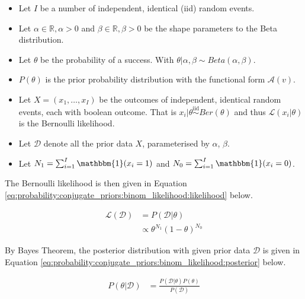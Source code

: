 \begin{itemize}
      \item Let $I$ be a number of independent, identical  (iid) random events.

      \item Let $\alpha \in \mathbb{R}, \alpha > 0$ and $\beta \in \mathbb{R}, \beta >0$ be the shape parameters to the Beta distribution.

      \item Let $\theta$ be the probability of a success. With $\theta | \alpha, \beta \sim Beta(\alpha, \beta)$.

      \item $P(\theta)$ is the prior probability distribution with the functional form $\mathcal{A}(v)$.

      \item Let $X = (x_{1}, \dots, x_{I})$ be the outcomes of independent, identical random events, each with boolean outcome. That is $x_{i} | \theta \overset{\text{iid}}{\sim} Ber(\theta)$ and thus $\mathcal{L}(x_{i} \vert \theta)$ is the Bernoulli likelihood.

      \item Let $\mathcal{D}$ denote all the prior data $X$, parameterised by $\alpha$, $\beta$.

      \item Let $N_{1} = \sum_{i=1}^{I} \mathbbm{1}(x_{i} = 1)$ and $N_{0} = \sum_{i=1}^{I} \mathbbm{1}(x_{i} = 0)$.
\end{itemize}

The Bernoulli likelihood is then given in Equation \ref{eq:probability:conjugate_priors:binom_likelihood:likelihood} below.

\begin{equation}
      \label{eq:probability:conjugate_priors:binom_likelihood:likelihood}
      \begin{split}
            \mathcal{L}(\mathcal{D}) &=  P(\mathcal{D} | \theta) \\
            &\propto \theta^{N_{1}}(1-\theta)^{N_{0}}
      \end{split}
\end{equation}

By Bayes Theorem, the posterior distribution with given prior data $\mathcal{D}$ is given in Equation \ref{eq:probability:conjugate_priors:binom_likelihood:posterior} below.

\begin{equation}
      \begin{split}
            \label{eq:probability:conjugate_priors:binom_likelihood:posterior}
            P(\theta \vert \mathcal{D}) &= \frac{P(\mathcal{D} | \theta) P(\theta)}{P(\mathcal{D})}
      \end{split}
\end{equation}

